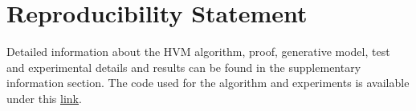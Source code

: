 \documentclass{article} %
\theoremstyle{remark}
\begin{document}


\section{Reproducibility Statement}%
Detailed information about the HVM algorithm, proof, generative model, test and experimental details and results can be found in the supplementary information section. The code used for the algorithm and experiments is available under this \href{https://github.com/swu32/HVM}{link}.


\end{document}
